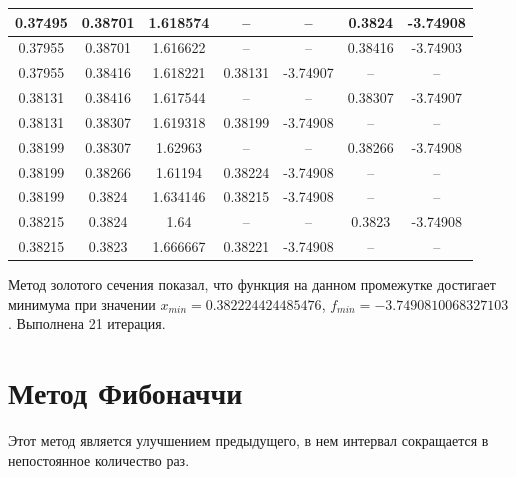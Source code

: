 \documentclass[12pt]{article}
\begin{document}
\begin{table}[h]
\begin{tabular}{|c|c|c|c|c|c|c|}
0.37495 & 0.38701 & 1.618574 & --      & --       & 0.3824  & -3.74908 \\ \hline
0.37955 & 0.38701 & 1.616622 & --      & --       & 0.38416 & -3.74903 \\ \hline
0.37955 & 0.38416 & 1.618221 & 0.38131 & -3.74907 & --      & --       \\ \hline
0.38131 & 0.38416 & 1.617544 & --      & --       & 0.38307 & -3.74907 \\ \hline
0.38131 & 0.38307 & 1.619318 & 0.38199 & -3.74908 & --      & --       \\ \hline
0.38199 & 0.38307 & 1.62963  & --      & --       & 0.38266 & -3.74908 \\ \hline
0.38199 & 0.38266 & 1.61194  & 0.38224 & -3.74908 & --      & --       \\ \hline
0.38199 & 0.3824  & 1.634146 & 0.38215 & -3.74908 & --      & --       \\ \hline
0.38215 & 0.3824  & 1.64     & --      & --       & 0.3823  & -3.74908 \\ \hline
0.38215 & 0.3823  & 1.666667 & 0.38221 & -3.74908 & --      & --       \\ \hline
\end{tabular}
\end{table}

Метод золотого сечения показал, что функция на данном промежутке достигает минимума при значении $x_{min} = 0.382224424485476$, $f_{min} = -3.7490810068327103$. Выполнена 21 итерация.

\newpage
\section{Метод Фибоначчи}

Этот метод является улучшением предыдущего, в нем интервал сокращается в непостоянное количество раз.
\end{document}
